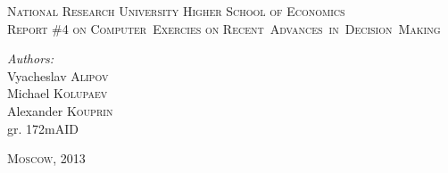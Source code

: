 \begin{titlepage}

\begin{center}
	\textsc{\Large National Research University Higher School of Economics}\\[8cm]

	\textsc{\large Report \#4 on Computer~Exercies on Recent~Advances~in~Decision~Making}\\[8cm]
\end{center}

\begin{flushright}
	\emph{Authors:}\\
	Vyacheslav \textsc{Alipov}\\
	Michael \textsc{Kolupaev}\\
	Alexander \textsc{Kouprin}\\
	gr. 172mAID
\end{flushright}

\vfill

\begin{center}
	\textsc{\large Moscow, 2013}
\end{center}

\end{titlepage}
